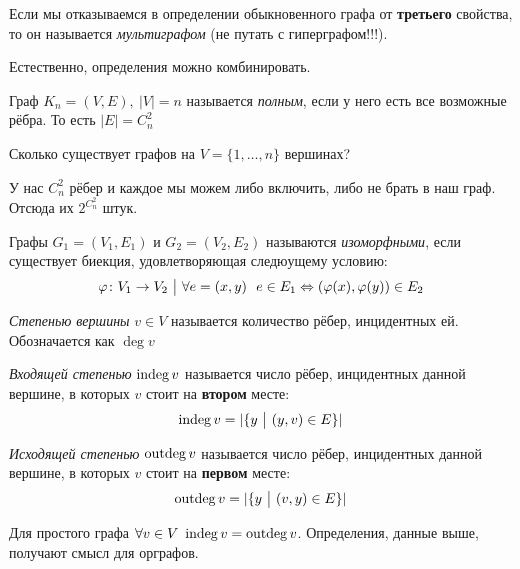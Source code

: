 \begin{definition}
	Если мы отказываемся в определении обыкновенного графа от \textbf{третьего} свойства, то он называется \textit{мультиграфом} (не путать с гиперграфом!!!).
\end{definition}

\begin{note}
	Естественно, определения можно комбинировать.
\end{note}

\begin{definition}
	Граф $K_n = (V, E),\ |V| = n$ называется \textit{полным}, если у него есть все возможные рёбра. То есть $|E| = C_n^2$
\end{definition}

\begin{example}
	Сколько существует графов на $V = \{1, \ldots, n\}$ вершинах?
	
	У нас $C_n^2$ рёбер и каждое мы можем либо включить, либо не брать в наш граф. Отсюда их $2^{C_n^2}$ штук.
\end{example}

\begin{definition}
	Графы $G_1 = (V_1, E_1)$ и $G_2 = (V_2, E_2)$ называются \textit{изоморфными}, если существует биекция, удовлетворяющая следюущему условию:
	\[
		\varphi \colon V_1 \to V_2 \ \big|\  \forall e = (x, y)\ \ e \in E_1 \Leftrightarrow (\varphi(x), \varphi(y)) \in E_2
	\]
\end{definition}

\begin{definition}
	\textit{Степенью вершины} $v \in V$ называется количество рёбер, инцидентных ей. Обозначается как $\deg v$
\end{definition}

\begin{definition}
	\textit{Входящей степенью} $\operatorname{indeg} v$ называется число рёбер, инцидентных данной вершине, в которых $v$ стоит на \textbf{втором} месте:
	\[
		\operatorname{indeg} v = |\{y \ \big|\  (y, v) \in E\}|
	\]
\end{definition}

\begin{definition}
	\textit{Исходящей степенью} $\operatorname{outdeg} v$ называется число рёбер, инцидентных данной вершине, в которых $v$ стоит на \textbf{первом} месте:
	\[
		\operatorname{outdeg} v = |\{y \ \big|\  (v, y) \in E\}|
	\]
\end{definition}

\begin{note}
	Для простого графа $\forall v \in V\ \operatorname{indeg} v = \operatorname{outdeg} v$. Определения, данные выше, получают смысл для орграфов.
\end{note}

